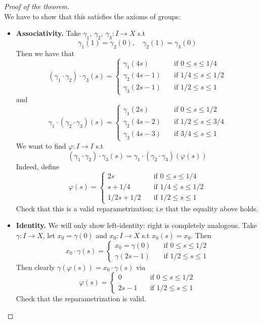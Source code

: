 \documentclass[11pt,a4paper]{article}
\theoremstyle{definition}
\theoremstyle{plain}
\theoremstyle{remark}
\newcommand{\1}{\mathbbm{1}}
\begin{document}
\begin{proof}[Proof of the theorem]
    \mbox{}\\
    We have to show that this satisfies the axioms of groups: 
    \begin{itemize}
        \item \textbf{Associativity.} Take $\gamma_1, \ \gamma_2, \ \gamma_3 \colon I \to X$ s.t 
        $$\gamma_1 (1) = \gamma_2 (0), \quad \gamma_2(1) = \gamma_3 (0)$$
        Then we have that 
        $$(\gamma_1 \cdot \gamma_2) \cdot \gamma_3 (s) = \begin{cases}
            \gamma_1 (4s) \quad &\text{if } 0 \leq s \leq 1/4 \\
            \gamma_2 (4s - 1) \quad &\text{if } 1/4 \leq s \leq 1/2 \\
            \gamma_3 (2s - 1) \quad &\text{if } 1/2 \leq s \leq 1 
        \end{cases}$$
        and 
        $$\gamma_1 \cdot (\gamma_2 \cdot \gamma_3) (s) = \begin{cases}
            \gamma_1 (2s) \quad &\text{if } 0 \leq s \leq 1/2 \\
            \gamma_2(4s - 2) \quad &\text{if } 1/2 \le s \le 3/4 \\
            \gamma_3(4s - 3) \quad &\text{if } 3/4 \le s \le 1 
        \end{cases}$$
        We want to find $\varphi \colon I \to I$ s.t 
        $$(\gamma_1 \cdot \gamma_2) \cdot \gamma_3 (s) = \gamma_1 \cdot (\gamma_2 \cdot \gamma_3) (\varphi(s))$$
        Indeed, define 
        $$\varphi (s) = \begin{cases}
            2s \quad &\text{if } 0 \leq s \le 1/4 \\
            s + 1/4 \quad &\text{if } 1/4 \leq s \leq 1/2 \\
            1/2 s + 1/2 \quad &\text{if } 1/2 \le s \le 1
        \end{cases}$$
        Check that this is a valid reparametrization; i.e that the equality above holds.

        \item \textbf{Identity.} We will only show left-identity: right is completely analogous. Take $\gamma \colon I \to X$, let 
        $x_0 = \gamma(0)$ and $x_0 \colon I \to X$ s.t $x_0(s) = x_0$. Then 
        $$x_0 \cdot \gamma (s) = \begin{cases}
            x_0 = \gamma(0) \quad &\text{if } 0 \le s \le 1/2 \\
            \gamma(2s - 1) \quad &\text{if } 1/2 \le s \le 1
        \end{cases}$$
        Then clearly $\gamma (\varphi(s)) = x_0 \cdot \gamma (s)$ via 
        $$\varphi(s) = \begin{cases}
            0 \quad &\text{if } 0 \le s \le 1/2 \\ 
            2s - 1\quad &\text{if } 1/2 \le s \le 1
        \end{cases}$$
        Check that the reparametrization is valid.
        

\end{itemize}
\end{proof}
\end{document}
